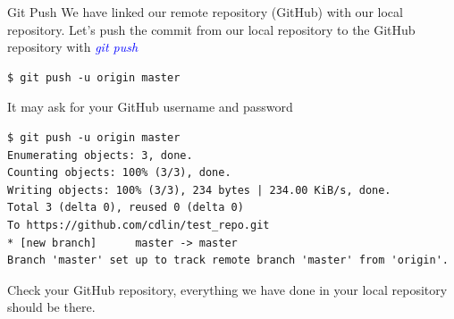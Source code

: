 \documentclass[11pt]{beamer}
\begin{document}
\begin{frame}[fragile]{Git Push}
We have linked our remote repository (GitHub) with our local repository. Let's push the commit from our local repository to the GitHub repository with \textcolor{blue}{\emph{git push}}
\begin{lstlisting}
$ git push -u origin master
\end{lstlisting}
It may ask for your GitHub username and password
\begin{lstlisting}[frame=single]
$ git push -u origin master
Enumerating objects: 3, done.
Counting objects: 100% (3/3), done.
Writing objects: 100% (3/3), 234 bytes | 234.00 KiB/s, done.
Total 3 (delta 0), reused 0 (delta 0)
To https://github.com/cdlin/test_repo.git
* [new branch]      master -> master
Branch 'master' set up to track remote branch 'master' from 'origin'.
\end{lstlisting}
Check your GitHub repository, everything we have done in your local repository should be there.
\end{frame}
\end{document}
